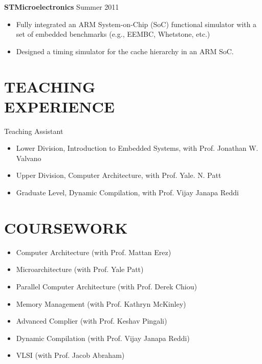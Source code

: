 \documentclass[margin, 9pt]{res} %
\begin{document}
\begin{resume}
\medskip
{\textbf{STMicroelectronics}} \hfill{Summer 2011}\\
\vspace*{-10pt}
\begin{itemize}[leftmargin=*] \itemsep -3pt
\vspace*{-5pt}
	\item Fully integrated an ARM System-on-Chip (SoC) functional simulator with a set of embedded benchmarks (e.g., EEMBC, Whetstone, etc.)
	\item Designed a timing simulator for the cache hierarchy in an ARM SoC.
\end{itemize}


\section{TEACHING\\ EXPERIENCE} 

{\large{Teaching Assistant}}\\
\vspace*{-5pt}
\begin{itemize}[leftmargin=*] \itemsep -2pt
\vspace*{-5pt}
	\item Lower Division, Introduction to Embedded Systems, with Prof. Jonathan W. Valvano
	\item Upper Division, Computer Architecture, with Prof. Yale. N. Patt
	\item Graduate Level, Dynamic Compilation, with Prof. Vijay Janapa Reddi
\end{itemize}


\section{COURSEWORK} 

\vspace*{-2pt}
\begin{itemize}[leftmargin=*] \itemsep -2pt
	\item Computer Architecture (with Prof. Mattan Erez)
	\item Microarchitecture (with Prof. Yale Patt)
	\item Parallel Computer Architecture (with Prof. Derek Chiou)
	\item Memory Management (with Prof. Kathryn McKinley)
	\item Advanced Complier (with Prof. Keshav Pingali)
	\item Dynamic Compilation (with Prof. Vijay Janapa Reddi)
	\item VLSI (with Prof. Jacob Abraham)
\end{itemize}
\end{resume}
\end{document}
